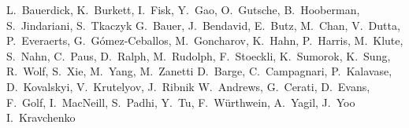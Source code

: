 \begin{Authlist}
%
L.~Bauerdick, K.~Burkett, I.~Fisk, Y.~Gao, O.~Gutsche, B.~Hooberman, S.~Jindariani, S.~Tkaczyk
%
G.~Bauer, J.~Bendavid, E.~Butz, M.~Chan, V.~Dutta, P.~Everaerts, G.~G\'omez-Ceballos, M.~Goncharov, K.~Hahn, P.~Harris, M.~Klute, S.~Nahn, C.~Paus, D.~Ralph, M.~Rudolph, F.~Stoeckli, K.~Sumorok, K.~Sung, R.~Wolf, S.~Xie, M.~Yang, M.~Zanetti
%
D.~Barge, C.~Campagnari, P.~Kalavase, D.~Kovalskyi, V.~Krutelyov, J.~Ribnik
%
W.~Andrews, G.~Cerati, D.~Evans, F.~Golf, I.~MacNeill, S.~Padhi, Y.~Tu, F.~W\"urthwein, A.~Yagil, J.~Yoo
%
I.~Kravchenko

\end{Authlist}
